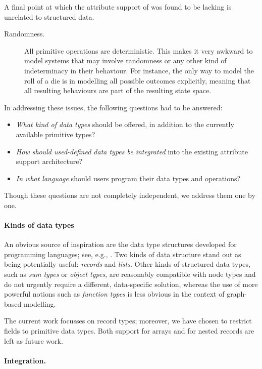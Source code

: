 %
A final point at which the attribute support of \GROOVE was found to be lacking is unrelated to structured data.
%
\begin{description}
\item[Randomness.] All primitive \GROOVE operations are deterministic. This makes it very awkward to model systems that may involve randomness or any other kind of indeterminacy in their behaviour. For instance, the only way to model the roll of a die is in modelling all possible outcomes explicitly, meaning that all resulting behaviours are part of the resulting state space.
\end{description}
%
In addressing these issues, the following questions had to be answered:
%
\begin{itemize}
\item \emph{What kind of data types} should be offered, in addition to the currently available primitive types?
\item \emph{How should used-defined data types be integrated} into the existing attribute support architecture?
\item \emph{In what language} should users program their data types and operations?
\end{itemize}
%
Though these questions are not completely independent, we address them one by one.
%
\paragraph{Kinds of data types}

An obvious source of inspiration are the data type structures developed for programming languages; see, e.g., \cite{PierceTypes}. Two kinds of data structure stand out as being potentially useful: \emph{records} and \emph{lists}. Other kinds of structured data types, such as \emph{sum types} or \emph{object types}, are reasonably compatible with node types and do not urgently require a different, data-specific solution, whereas the use of more powerful notions such as \emph{function types} is less obvious in the context of graph-based modelling.

The current work focusses on record types; moreover, we have chosen to restrict fields to primitive data types. Both support for arrays and for nested records are left as future work.

\paragraph{Integration.}

